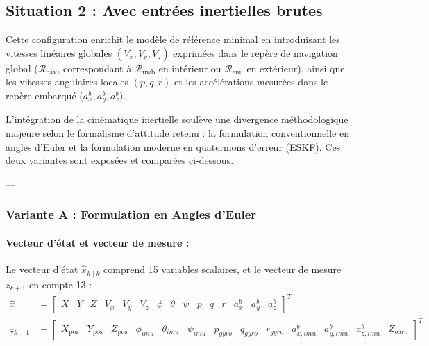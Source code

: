 \documentclass[../Formulations_Kalman.tex]{subfiles}
\begin{document}
\subsection{Situation 2 : Avec entrées inertielles brutes}
Cette configuration enrichit le modèle de référence minimal en introduisant les vitesses linéaires globales $(V_x, V_y, V_z)$ exprimées dans le repère de navigation global ($\mathcal{R}_{\text{nav}}$, correspondant à $\mathcal{R}_{\text{uwb}}$ en intérieur ou $\mathcal{R}_{\text{enu}}$ en extérieur), ainsi que les vitesses angulaires locales $(p, q, r)$ et les accélérations mesurées dans le repère embarqué ($a_x^b, a_y^b, a_z^b$).

L'intégration de la cinématique inertielle soulève une divergence méthodologique majeure selon le formalisme d'attitude retenu : la formulation conventionnelle en angles d'Euler et la formulation moderne en quaternions d'erreur (ESKF). Ces deux variantes sont exposées et comparées ci-dessous.

---

\subsubsection{Variante A : Formulation en Angles d'Euler}

\paragraph{Vecteur d'état et vecteur de mesure :}
Le vecteur d'état $\hat{x}_{k\mid k}$ comprend 15 variables scalaires, et le vecteur de mesure $z_{k+1}$ en compte 13 :
\begin{align}
\hat{x} &= \begin{bmatrix} X & Y & Z & V_x & V_y & V_z & \phi & \theta & \psi & p & q & r & a_x^b & a_y^b & a_z^b \end{bmatrix}^T \\
z_{k+1} &= \begin{bmatrix} X_{\text{pos}} & Y_{\text{pos}} & Z_{\text{pos}} & \phi_{imu} & \theta_{imu} & \psi_{imu} & p_{gyro} & q_{gyro} & r_{gyro} & a_{x,imu}^b & a_{y,imu}^b & a_{z,imu}^b & Z_{baro} \end{bmatrix}^T
\end{align}
\end{document}
